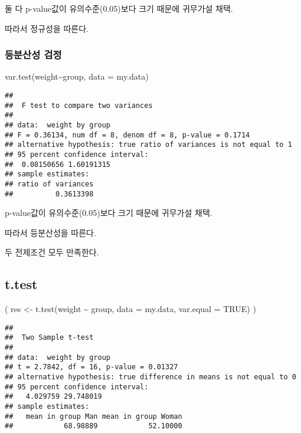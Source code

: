 \documentclass[
]{article}
\newenvironment{Shaded}{\begin{snugshade}}{\end{snugshade}}
\newcommand{\AttributeTok}[1]{\textcolor[rgb]{0.77,0.63,0.00}{#1}}
\newcommand{\ConstantTok}[1]{\textcolor[rgb]{0.00,0.00,0.00}{#1}}
\newcommand{\FunctionTok}[1]{\textcolor[rgb]{0.00,0.00,0.00}{#1}}
\newcommand{\NormalTok}[1]{#1}
\newcommand{\OtherTok}[1]{\textcolor[rgb]{0.56,0.35,0.01}{#1}}
\newcommand{\SpecialCharTok}[1]{\textcolor[rgb]{0.00,0.00,0.00}{#1}}
\begin{document}
둘 다 p-value값이 유의수준(0.05)보다 크기 때문에 귀무가설 채택.

따라서 정규성을 따른다.

\hypertarget{uxb4f1uxbd84uxc0b0uxc131-uxac80uxc815-1}{%
\subsubsection{등분산성 검정}\label{uxb4f1uxbd84uxc0b0uxc131-uxac80uxc815-1}}

\begin{Shaded}
\begin{Highlighting}[]
\FunctionTok{var.test}\NormalTok{(weight}\SpecialCharTok{\textasciitilde{}}\NormalTok{group, }\AttributeTok{data =}\NormalTok{ my.data)}
\end{Highlighting}
\end{Shaded}

\begin{verbatim}
## 
##  F test to compare two variances
## 
## data:  weight by group
## F = 0.36134, num df = 8, denom df = 8, p-value = 0.1714
## alternative hypothesis: true ratio of variances is not equal to 1
## 95 percent confidence interval:
##  0.08150656 1.60191315
## sample estimates:
## ratio of variances 
##          0.3613398
\end{verbatim}

p-value값이 유의수준(0.05)보다 크기 때문에 귀무가설 채택.

따라서 등분산성을 따른다.

두 전제조건 모두 만족한다.

\hypertarget{t.test-2}{%
\subsection{t.test}\label{t.test-2}}

\begin{Shaded}
\begin{Highlighting}[]
\NormalTok{( res }\OtherTok{\textless{}{-}} \FunctionTok{t.test}\NormalTok{(weight }\SpecialCharTok{\textasciitilde{}}\NormalTok{ group, }\AttributeTok{data =}\NormalTok{ my.data, }\AttributeTok{var.equal =} \ConstantTok{TRUE}\NormalTok{) )}
\end{Highlighting}
\end{Shaded}

\begin{verbatim}
## 
##  Two Sample t-test
## 
## data:  weight by group
## t = 2.7842, df = 16, p-value = 0.01327
## alternative hypothesis: true difference in means is not equal to 0
## 95 percent confidence interval:
##   4.029759 29.748019
## sample estimates:
##   mean in group Man mean in group Woman 
##            68.98889            52.10000
\end{verbatim}
\end{document}
